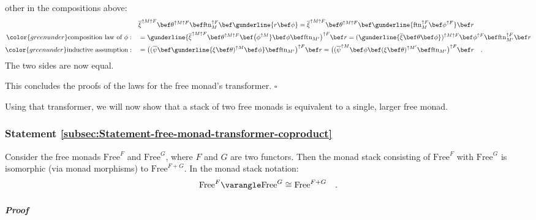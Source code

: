 other in the compositions above:
\begin{align*}
 & \overline{\xi}^{\uparrow M\uparrow F}\bef\theta^{\uparrow M\uparrow F}\bef\text{ftn}_{M}^{\uparrow F}\bef\gunderline{r\bef\phi}=\overline{\xi}^{\uparrow M\uparrow F}\bef\theta^{\uparrow M\uparrow F}\bef\gunderline{\text{ftn}_{M}^{\uparrow F}\bef\phi^{\uparrow F}}\bef r\\
{\color{greenunder}\text{composition law of }\phi:}\quad & =\gunderline{\overline{\xi}^{\uparrow M\uparrow F}\bef\theta^{\uparrow M\uparrow F}\bef\big(\phi^{\uparrow M}}\bef\phi\bef\text{ftn}_{M^{\prime}}\big)^{\uparrow F}\bef r=(\gunderline{\overline{\xi}\bef\theta\bef\phi})^{\uparrow M\uparrow F}\bef\phi^{\uparrow F}\bef\text{ftn}_{M^{\prime}}^{\uparrow F}\bef r\\
{\color{greenunder}\text{inductive assumption}:}\quad & =\big((\overline{\psi}\bef\gunderline{\xi\bef\theta)^{\uparrow M}\bef\phi}\bef\text{ftn}_{M^{\prime}}\big)^{\uparrow F}\bef r=\big((\overline{\psi}^{\uparrow M}\bef\phi\bef(\xi\bef\theta)^{\uparrow M^{\prime}}\bef\text{ftn}_{M^{\prime}}\big)^{\uparrow F}\bef r\quad.
\end{align*}
The two sides are now equal.

This concludes the proofs of the laws for the free monad\textsf{'}s transformer.
$\square$

Using that transformer, we will now show that a stack of two free
monads is equivalent to a single, larger free monad.

\subsubsection{Statement \label{subsec:Statement-free-monad-transformer-coproduct}\ref{subsec:Statement-free-monad-transformer-coproduct}}

Consider the free monads $\text{Free}^{F}$ and $\text{Free}^{G}$,
where $F$ and $G$ are two functors. Then the monad stack consisting
of $\text{Free}^{F}$ with $\text{Free}^{G}$ is isomorphic (via monad
morphisms) to $\text{Free}^{F+G}$. In the monad stack notation:
\[
\text{Free}^{F}\varangle\text{Free}^{G}\cong\text{Free}^{F+G}\quad.
\]


\subparagraph{Proof}

